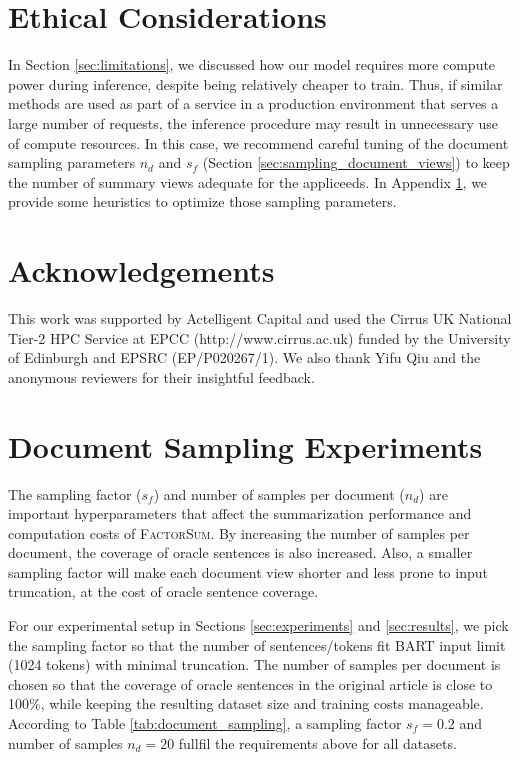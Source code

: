\documentclass[11pt,table]{article}
\newcommand{\modelname}{FactorSum}
\begin{document}
\section*{Ethical Considerations}
In Section \ref{sec:limitations}, we discussed how our model requires more compute power during inference, despite being relatively cheaper to train. Thus, if similar methods are used as part of a service in a production environment that serves a large number of requests, the inference procedure may result in unnecessary use of compute resources. In this case, we recommend careful tuning of the document sampling parameters $n_d$ and $s_f$ (Section \ref{sec:sampling_document_views}) to keep the number of summary views adequate for the appliceeds. In Appendix \ref{sec:document_sampling_details}, we provide some heuristics to optimize those sampling parameters.

\section*{Acknowledgements}
This work was supported by Actelligent Capital and used the Cirrus UK National Tier-2 HPC Service at EPCC (http://www.cirrus.ac.uk) funded by the University of Edinburgh and EPSRC (EP/P020267/1). We also thank Yifu Qiu and the anonymous reviewers for their insightful feedback.



\clearpage
\appendix

\section{Document Sampling Experiments}
\label{sec:document_sampling_details}
The sampling factor ($s_f$) and number of samples per document ($n_d$) are important hyperparameters that affect the summarization performance and computation costs of \textsc{\modelname}. By increasing the number of samples per document, the coverage of oracle sentences is also increased. Also, a smaller sampling factor will make each document view shorter and less prone to input truncation, at the cost of oracle sentence coverage. 

For our experimental setup in Sections \ref{sec:experiments} and \ref{sec:results}, we pick the sampling factor so that the number of sentences/tokens fit BART input limit (1024 tokens) with minimal truncation. The number of samples per document is chosen so that the coverage of oracle sentences in the original article is close to 100\%, while keeping the resulting dataset size and training costs manageable. According to Table \ref{tab:document_sampling}, a sampling factor $s_f=0.2$ and number of samples $n_d=20$ fullfil the requirements above for all datasets.
\end{document}

